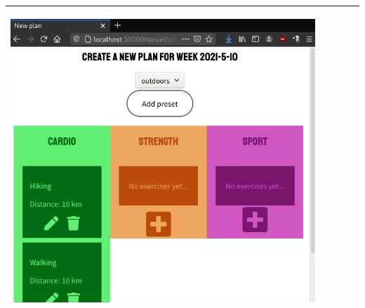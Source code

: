 \documentclass[12pt,twoside,titlepage,a4paper]{article}
\theoremstyle{definicion}
\theoremstyle{lema}
\theoremstyle{teorema}
\theoremstyle{corolario}
\theoremstyle{ejemplo}
\theoremstyle{nota}
\begin{document}
\begin{table}[!h]
\begin{tabular}{|m{0.6cm}|m{2.9cm}|m{3.6cm}|m{1.1cm}|m{5.9cm}|}
		\begin{center}\includegraphics[scale=0.22]{newplan2.png}\end{center} \\
		\hline
	\end{tabular}
\end{table}
\newpage
\end{document}
